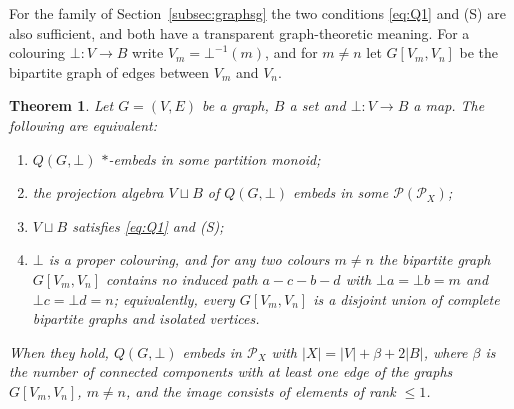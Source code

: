 \documentclass[11pt]{amsart}
\newtheorem{theorem}{Theorem}[section]
\theoremstyle{definition}
\renewcommand{\P}{\mathcal{P}}
\begin{document}
For the family of Section~\ref{subsec:graphsg} the two conditions \eqref{eq:Q1} and (S) are also sufficient, and both have a transparent graph-theoretic meaning. For a colouring $\bot\colon V\to B$ write $V_m=\bot^{-1}(m)$, and for $m\ne n$ let $G[V_m,V_n]$ be the bipartite graph of edges between $V_m$ and $V_n$.

\begin{theorem}\label{thm:graphsg}
Let $G=(V,E)$ be a graph, $B$ a set and $\bot\colon V\to B$ a map. The following are equivalent:
\begin{enumerate}[label=\textup{(\roman*)},nosep]
\item $Q(G,\bot)$ $*$-embeds in some partition monoid;
\item the projection algebra $V\sqcup B$ of $Q(G,\bot)$ embeds in some $\P(\P_X)$;
\item $V\sqcup B$ satisfies \eqref{eq:Q1} and (S);
\item $\bot$ is a proper colouring, and for any two colours $m\ne n$ the bipartite graph $G[V_m,V_n]$ contains no induced path $a-c-b-d$ with $\bot a=\bot b=m$ and $\bot c=\bot d=n$; equivalently, every $G[V_m,V_n]$ is a disjoint union of complete bipartite graphs and isolated vertices.
\end{enumerate}
When they hold, $Q(G,\bot)$ embeds in $\P_X$ with $|X|=|V|+\beta+2|B|$, where $\beta$ is the number of connected components with at least one edge of the graphs $G[V_m,V_n]$, $m\ne n$, and the image consists of elements of rank $\le1$.
\end{theorem}
\end{document}
